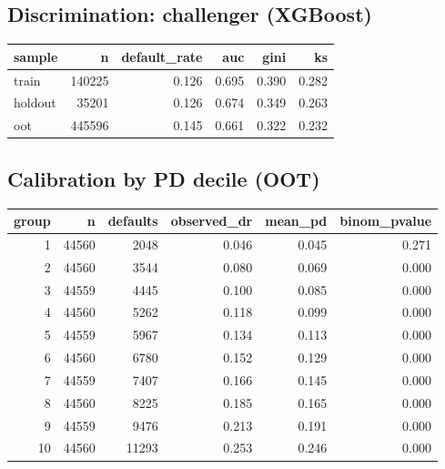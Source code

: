 \documentclass[11pt,a4paper]{article}
\begin{document}
\subsection*{Discrimination: challenger (XGBoost)}
\begin{tabular}{lrrrrr}
\toprule
sample & n & default\_rate & auc & gini & ks \\
\midrule
train & 140225 & 0.126 & 0.695 & 0.390 & 0.282 \\
holdout & 35201 & 0.126 & 0.674 & 0.349 & 0.263 \\
oot & 445596 & 0.145 & 0.661 & 0.322 & 0.232 \\
\bottomrule
\end{tabular}

\subsection*{Calibration by PD decile (OOT)}
\begin{tabular}{rrrrrr}
\toprule
group & n & defaults & observed\_dr & mean\_pd & binom\_pvalue \\
\midrule
1 & 44560 & 2048 & 0.046 & 0.045 & 0.271 \\
2 & 44560 & 3544 & 0.080 & 0.069 & 0.000 \\
3 & 44559 & 4445 & 0.100 & 0.085 & 0.000 \\
4 & 44560 & 5262 & 0.118 & 0.099 & 0.000 \\
5 & 44559 & 5967 & 0.134 & 0.113 & 0.000 \\
6 & 44560 & 6780 & 0.152 & 0.129 & 0.000 \\
7 & 44559 & 7407 & 0.166 & 0.145 & 0.000 \\
8 & 44560 & 8225 & 0.185 & 0.165 & 0.000 \\
9 & 44559 & 9476 & 0.213 & 0.191 & 0.000 \\
10 & 44560 & 11293 & 0.253 & 0.246 & 0.000 \\
\bottomrule
\end{tabular}
\end{document}
